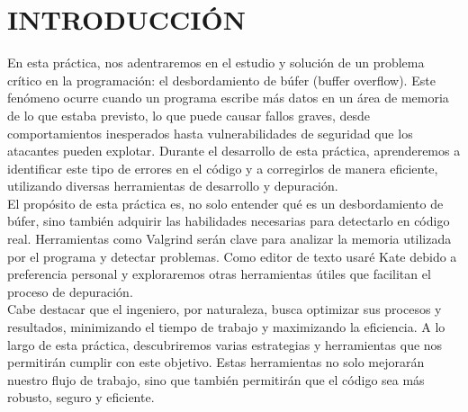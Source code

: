 \chapter*{INTRODUCCIÓN}

\noindent
En esta práctica, nos adentraremos en el estudio y solución de un problema crítico en la programación: el desbordamiento de búfer (buffer overflow). Este fenómeno ocurre cuando un programa escribe más datos en un área de memoria de lo que estaba previsto, lo que puede causar fallos graves, desde comportamientos inesperados hasta vulnerabilidades de seguridad que los atacantes pueden explotar. Durante el desarrollo de esta práctica, aprenderemos a identificar este tipo de errores en el código y a corregirlos de manera eficiente, utilizando diversas herramientas de desarrollo y depuración.
\vspace{0.3cm}
\\
El propósito de esta práctica es, no solo entender qué es un desbordamiento de búfer, sino también adquirir las habilidades necesarias para detectarlo en código real. Herramientas como Valgrind serán clave para analizar la memoria utilizada por el programa y detectar problemas. Como editor de texto usaré Kate debido a preferencia personal y exploraremos otras herramientas útiles que facilitan el proceso de depuración.
\vspace{0.3cm}
\\
Cabe destacar que el ingeniero, por naturaleza, busca optimizar sus procesos y resultados, minimizando el tiempo de trabajo y maximizando la eficiencia. A lo largo de esta práctica, descubriremos varias estrategias y herramientas que nos permitirán cumplir con este objetivo. Estas herramientas no solo mejorarán nuestro flujo de trabajo, sino que también permitirán que el código sea más robusto, seguro y eficiente. \par
